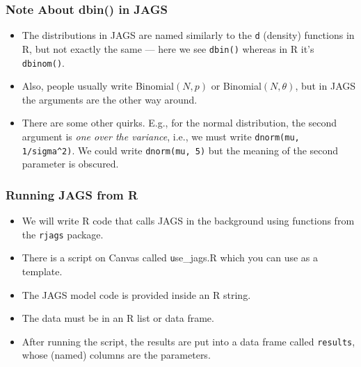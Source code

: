 \documentclass{beamer}
\begin{document}
\begin{frame}[fragile]
\frametitle{Note About dbin() in JAGS}

\begin{itemize}
\item The distributions in JAGS are named similarly to the \texttt{d}
(density) functions in R, but not exactly the same --- here we see
\texttt{dbin()} whereas in R it's \texttt{dbinom()}.\pause
\item Also, people usually write Binomial$(N, p)$ or Binomial$(N, \theta)$,
but in JAGS the arguments are the other way around.\pause
\item There are some other quirks. E.g., for the normal distribution, the
second argument is {\em one over the variance}, i.e., we must write
\texttt{dnorm(mu, 1/sigma^2)}. 
We could write \texttt{dnorm(mu, 5)}
but the meaning of the second parameter is obscured.
\end{itemize}

\end{frame}



\begin{frame}[fragile]
\frametitle{Running JAGS from R}

\begin{itemize}
\item We will write R code that calls JAGS in the background using functions
from the \texttt{rjags} package.\pause
\item There is a script on Canvas called {\texttt use\_jags.R} which you can
use as a template.\pause
\item The JAGS model code is provided inside an R string.\pause
\item The data must be in an R list or data frame.\pause
\item After running the script, the results are put into a data frame called
\texttt{results}, whose (named) columns are the parameters.
\end{itemize}

\end{frame}
\end{document}
